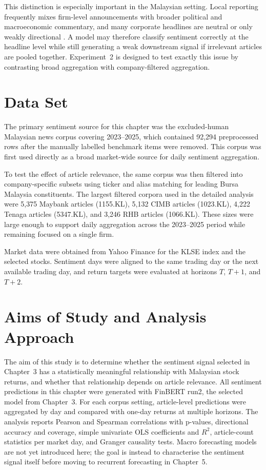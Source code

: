 \documentclass[12pt]{ucetd}
\begin{document}
This distinction is especially important in the Malaysian setting. Local reporting frequently mixes firm-level announcements with broader political and macroeconomic commentary, and many corporate headlines are neutral or only weakly directional \cite{cheng2019malaysian, tan2025klse}. A model may therefore classify sentiment correctly at the headline level while still generating a weak downstream signal if irrelevant articles are pooled together. Experiment~2 is designed to test exactly this issue by contrasting broad aggregation with company-filtered aggregation.
\section{Data Set}
The primary sentiment source for this chapter was the excluded-human Malaysian news corpus covering 2023--2025, which contained 92,294 preprocessed rows after the manually labelled benchmark items were removed. This corpus was first used directly as a broad market-wide source for daily sentiment aggregation.

To test the effect of article relevance, the same corpus was then filtered into company-specific subsets using ticker and alias matching for leading Bursa Malaysia constituents. The largest filtered corpora used in the detailed analysis were 5,375 Maybank articles (1155.KL), 5,132 CIMB articles (1023.KL), 4,222 Tenaga articles (5347.KL), and 3,246 RHB articles (1066.KL). These sizes were large enough to support daily aggregation across the 2023--2025 period while remaining focused on a single firm.

Market data were obtained from Yahoo Finance for the KLSE index and the selected stocks. Sentiment days were aligned to the same trading day or the next available trading day, and return targets were evaluated at horizons $T$, $T{+}1$, and $T{+}2$.
\section{Aims of Study and Analysis Approach}
The aim of this study is to determine whether the sentiment signal selected in Chapter~3 has a statistically meaningful relationship with Malaysian stock returns, and whether that relationship depends on article relevance. All sentiment predictions in this chapter were generated with FinBERT run2, the selected model from Chapter~3. For each corpus setting, article-level predictions were aggregated by day and compared with one-day returns at multiple horizons. The analysis reports Pearson and Spearman correlations with p-values, directional accuracy and coverage, simple univariate OLS coefficients and $R^2$, article-count statistics per market day, and Granger causality tests. Macro forecasting models are not yet introduced here; the goal is instead to characterise the sentiment signal itself before moving to recurrent forecasting in Chapter~5.
\end{document}
